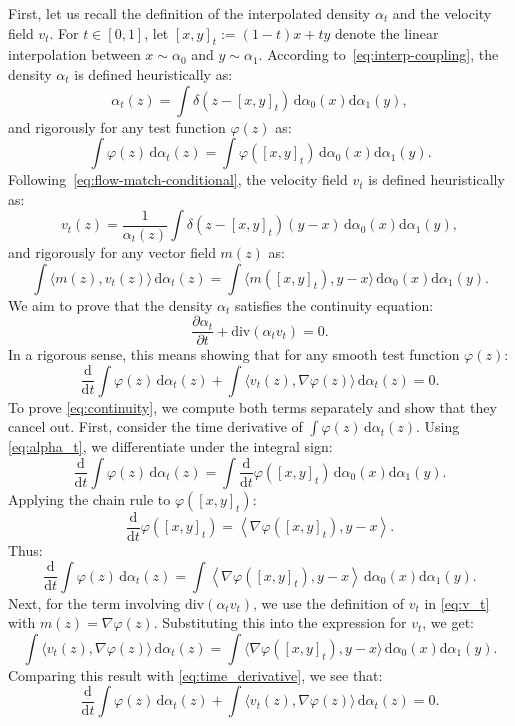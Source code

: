 First, let us recall the definition of the interpolated density \(\alpha_t\) and the velocity field \(v_t\). For \(t \in [0, 1]\), let \([x, y]_t := (1-t)x + ty\) denote the linear interpolation between \(x \sim \alpha_0\) and \(y \sim \alpha_1\). According to~\eqref{eq:interp-coupling}, the density \(\alpha_t\) is defined heuristically as:
\[
\alpha_t(z) = \int \delta(z - [x, y]_t) \, \mathrm{d}\alpha_0(x)\mathrm{d}\alpha_1(y),
\]
and rigorously for any test function \(\varphi(z)\) as:
\begin{equation}
\int \varphi(z) \, \mathrm{d}\alpha_t(z) = \int \varphi([x, y]_t) \, \mathrm{d}\alpha_0(x)\mathrm{d}\alpha_1(y). \label{eq:alpha_t}
\end{equation}
Following~\eqref{eq:flow-match-conditional}, the velocity field \(v_t\) is defined heuristically as:
\[
v_t(z) = \frac{1}{\alpha_t(z)} \int \delta(z - [x, y]_t)(y - x) \, \mathrm{d}\alpha_0(x)\mathrm{d}\alpha_1(y),
\]
and rigorously for any vector field \(m(z)\) as:
\begin{equation}
\int \langle m(z), v_t(z) \rangle \, \mathrm{d}\alpha_t(z) = \int \langle m([x, y]_t), y - x \rangle \, \mathrm{d}\alpha_0(x)\mathrm{d}\alpha_1(y). \label{eq:v_t}
\end{equation}
We aim to prove that the density \(\alpha_t\) satisfies the continuity equation:
\[
\frac{\partial \alpha_t}{\partial t} + \mathrm{div}(\alpha_t v_t) = 0.
\]
In a rigorous sense, this means showing that for any smooth test function \(\varphi(z)\):
\begin{equation}
\frac{\mathrm{d}}{\mathrm{d}t} \int \varphi(z) \, \mathrm{d}\alpha_t(z) + \int \langle v_t(z), \nabla \varphi(z) \rangle \, \mathrm{d}\alpha_t(z) = 0. \label{eq:continuity}
\end{equation}
To prove \eqref{eq:continuity}, we compute both terms separately and show that they cancel out. First, consider the time derivative of \(\int \varphi(z) \, \mathrm{d}\alpha_t(z)\). Using \eqref{eq:alpha_t}, we differentiate under the integral sign:
\[
\frac{\mathrm{d}}{\mathrm{d}t} \int \varphi(z) \, \mathrm{d}\alpha_t(z) = \int \frac{\mathrm{d}}{\mathrm{d}t} \varphi([x, y]_t) \, \mathrm{d}\alpha_0(x)\mathrm{d}\alpha_1(y).
\]
Applying the chain rule to \(\varphi([x, y]_t)\):
\[
\frac{\mathrm{d}}{\mathrm{d}t} \varphi([x, y]_t) = \left\langle \nabla \varphi([x, y]_t), y - x \right\rangle.
\]
Thus:
\[
\frac{\mathrm{d}}{\mathrm{d}t} \int \varphi(z) \, \mathrm{d}\alpha_t(z) = \int \left\langle \nabla \varphi([x, y]_t), y - x \right\rangle \, \mathrm{d}\alpha_0(x)\mathrm{d}\alpha_1(y). \label{eq:time_derivative}
\]
Next, for the term involving \(\mathrm{div}(\alpha_t v_t)\), we use the definition of \(v_t\) in \eqref{eq:v_t} with \(m(z) = \nabla \varphi(z)\). Substituting this into the expression for \(v_t\), we get:
\[
\int \langle v_t(z), \nabla \varphi(z) \rangle \, \mathrm{d}\alpha_t(z) = \int \langle \nabla \varphi([x, y]_t), y - x \rangle \, \mathrm{d}\alpha_0(x)\mathrm{d}\alpha_1(y).
\]
Comparing this result with \eqref{eq:time_derivative}, we see that:
\[
\frac{\mathrm{d}}{\mathrm{d}t} \int \varphi(z) \, \mathrm{d}\alpha_t(z) + \int \langle v_t(z), \nabla \varphi(z) \rangle \, \mathrm{d}\alpha_t(z) = 0.
\]
